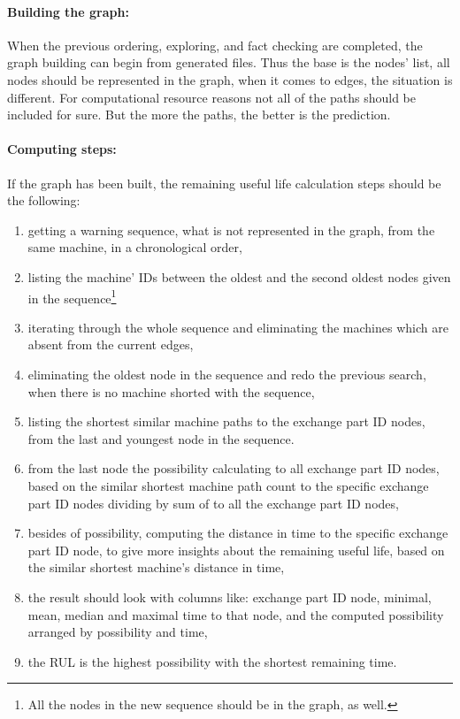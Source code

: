 			\paragraph{Building the graph:}
			When the previous ordering, exploring, and fact checking are completed, the graph building can begin from generated files. Thus the base is the nodes' list, all nodes should be represented in the graph, when it comes to edges, the situation is different. For computational resource reasons not all of the paths should be included for sure. But the more the paths, the better is the prediction.
\clearpage\paragraph{Computing steps:}
			If the graph has been built, the remaining useful life calculation steps should be the following:
			\begin{enumerate}
				\item{getting a warning sequence, what is not represented in the graph, from the same machine, in a chronological order,}
				\item{listing the machine' IDs between the oldest and the second oldest nodes given in the sequence}\footnote{All the nodes in the new sequence should be in the graph, as well.} 
				\item{iterating through the whole sequence and eliminating the machines which are absent from the current edges,}
				\item{eliminating the oldest node in the sequence and redo the previous search, when there is no machine shorted with the sequence,}
				\item{listing the shortest similar machine paths to the exchange part ID nodes, from the last and youngest node in the sequence.}
				\item{from the last node the possibility calculating to all exchange part ID nodes, based on the similar shortest machine path count to the specific exchange part ID nodes dividing by sum of to all the exchange part ID nodes,}
				\item{besides of possibility, computing the distance in time  to the specific exchange part ID node, to give more insights about the remaining useful life, based on the similar shortest machine's distance in time,}
				\item{the result should look with columns like: exchange part ID node, minimal, mean, median and maximal time to that node, and the computed possibility arranged by possibility and time,} 
		 		\item{the RUL is the highest possibility with the shortest remaining time.}
		 	\end{enumerate}
		
